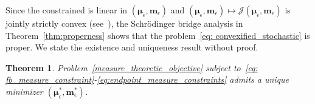 \documentclass{amsart}
\newtheorem{theorem}{Theorem}[section]
\numberwithin{equation}{section}
\begin{document}
Since the constrained 
is linear in $(\boldsymbol{\mu}_\epsilon,\mathbf{m}_\epsilon)$ and $(\boldsymbol{\mu}_\epsilon,\mathbf{m}_\epsilon)\mapsto \mathcal{J}(\boldsymbol{\mu}_\epsilon,\mathbf{m}_\epsilon)$ is jointly strictly convex (see~\cite{BenamouBrenier2000}), the Schr\"odinger bridge analysis in Theorem~\eqref{thm:properness} shows that the problem~\eqref{eq: convexified_stochastic} is proper. 
We state the existence and uniqueness result without proof.
\begin{theorem}\label{thm: existence and uniqueness}
Problem~\eqref{measure_theoretic_objective} subject to~\eqref{eq: fb_measure_constraint}-\eqref{eq:endpoint_measure_constraints} admits a unique minimizer $(\boldsymbol\mu_{\epsilon}^*, \mathbf m_{\epsilon}^*)$.  
\end{theorem} 
\end{document}
